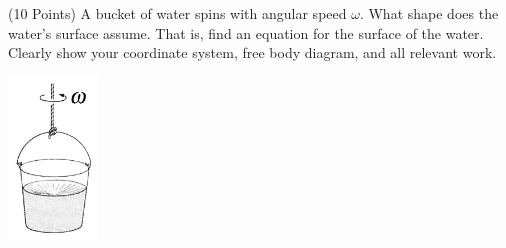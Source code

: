 \documentclass{esg8012exam}
\begin{document}
\begin{problem}{(10 Points)}
  A bucket of water spins with angular speed $\omega$.  What shape does the water's surface assume.  That is, find an equation for the surface of the water.  Clearly show your coordinate system, free body diagram, and all relevant work.
  \begin{center}
    \includegraphics[width=0.18\textwidth]{exam1_p4_1}
  \end{center}
\end{problem}
\end{document}
